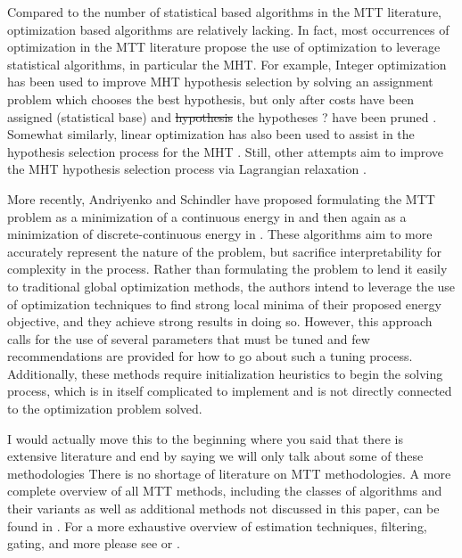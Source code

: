 \documentclass[journal]{IEEEtran}
\begin{document}
Compared to the number of statistical based algorithms in the MTT literature, optimization based algorithms are relatively lacking. In fact, most occurrences of optimization in the MTT literature propose the use of optimization to leverage statistical algorithms, in particular the MHT. For example, Integer optimization has been used to improve MHT hypothesis selection by solving an assignment problem which chooses the best hypothesis, but only after costs have been assigned (statistical base) and {\color{red} \sout{hypothesis} the hypotheses ? } have been pruned \cite{MHT-IP}. Somewhat similarly, linear optimization has also been used to assist in the hypothesis selection process for the MHT \cite{MHT-LP}. Still, other attempts aim to improve the MHT hypothesis selection process via Lagrangian relaxation \cite{Lagrangian}. 

More recently, Andriyenko and Schindler have proposed formulating the MTT problem as a minimization of a continuous energy in \cite{Continuous_energy} and then again as a minimization of discrete-continuous energy in \cite{Discrete-Continuous_energy}. These algorithms aim to more accurately represent the nature of the problem, but sacrifice interpretability for complexity in the process. Rather than formulating the problem to lend it easily to traditional global optimization methods, the authors intend to leverage the use of optimization techniques to find strong local minima of their proposed energy objective, and they achieve strong results in doing so. However, this approach calls for the use of several parameters that must be tuned and few recommendations are provided for how to go about such a tuning process. Additionally, these methods require initialization heuristics to begin the solving process, {\color{red} which is in itself complicated to implement and is not directly connected to the optimization problem solved}. 

{\color{red} I would actually move this to the beginning where you said that there is extensive literature and end by saying we will only talk about some of these methodologies} There is no shortage of literature on MTT methodologies. A more complete overview of all MTT methods, including the classes of algorithms and their variants as well as additional methods not discussed in this paper, can be found in \cite{MTT-Taxonomy}. For a more exhaustive overview of estimation techniques, filtering, gating, and more please see \cite{Bar-Shalom_MTT} or \cite{Bar-Shalom_Estimation}.
\end{document}

